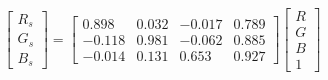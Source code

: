 \begin{equation}
\begin{bmatrix}
  R_s \\ G_s \\ B_s 
\end{bmatrix}=
\left[\begin{matrix}0.898 & 0.032 & -0.017 & 0.789\\ 
-0.118 & 0.981 & -0.062 & 0.885\\ 
-0.014 & 0.131 & 0.653 & 0.927\end{matrix}\right]
\begin{bmatrix}
  R \\ G \\ B \\ 1 
\end{bmatrix}
\end{equation}
